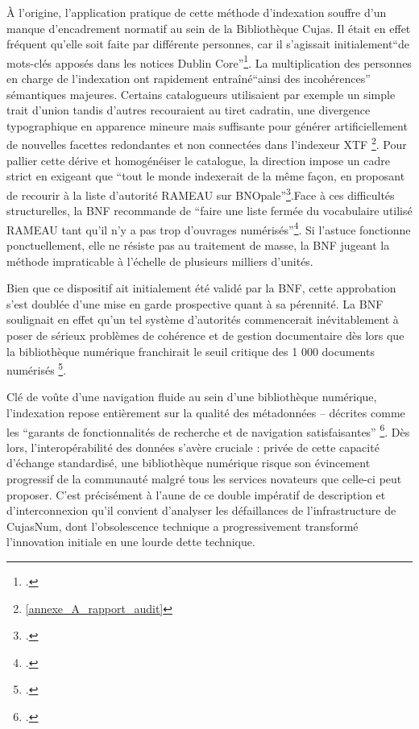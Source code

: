À l'origine, l'application pratique de cette méthode d'indexation souffre d'un manque d'encadrement normatif au sein de la Bibliothèque Cujas. Il était en effet fréquent qu'elle soit faite par différente personnes, car il s'agissait initialement\enquote{de mots-clés apposés dans les notices Dublin Core}\footcite{2013_Num_Indexation_manuel_FHdocEspaceTravail}. La multiplication des personnes en charge de l'indexation ont rapidement entraîné\enquote{ainsi des incohérences} sémantiques majeures. Certains catalogueurs utilisaient par exemple un simple trait d'union tandis d'autres recouraient au tiret cadratin, une divergence typographique en apparence mineure mais suffisante pour générer artificiellement de nouvelles facettes redondantes et non connectées dans l'indexeur \ac{XTF} \footnote{\ref{annexe_A_rapport_audit}}. Pour pallier cette dérive et homogénéiser le catalogue, la direction impose un cadre strict en exigeant que \enquote{tout le monde indexerait de la même façon, en proposant de recourir à la liste d'autorité \ac{RAMEAU} sur BNOpale}\footcite{2013_Num_Indexation_manuel_FHdocEspaceTravail}.Face à ces difficultés structurelles, la \ac{BNF} recommande de \enquote{faire une liste fermée du vocabulaire utilisé \ac{RAMEAU} tant qu'il n'y a pas trop d'ouvrages numérisés}\footcite{2013_Num_Indexation_manuel_FHdocEspaceTravail}. Si l'astuce fonctionne ponctuellement, elle ne résiste pas au traitement de masse, la \ac{BNF} jugeant la méthode impraticable à l'échelle de plusieurs milliers d'unités. 

Bien que ce dispositif ait initialement été  validé par la \ac{BNF}, cette approbation s'est doublée d'une mise en garde prospective quant à sa pérennité. La \ac{BNF} soulignait en effet qu'un tel système d'autorités commencerait inévitablement à poser de sérieux problèmes de cohérence et de gestion documentaire dès lors que la bibliothèque numérique franchirait le seuil critique des 1 000 documents numérisés \footcite{2013_Num_Indexation_manuel_FHdocEspaceTravail}.

Clé de voûte d'une navigation fluide au sein d'une bibliothèque numérique, l'indexation repose entièrement sur la qualité des métadonnées -- décrites comme les \enquote{garants de fonctionnalités de recherche et de navigation satisfaisantes} \footcite{stutzmannSignalerRessourcesNumerisees2013}. Dès lors, l'interopérabilité des données s'avère cruciale : privée de cette capacité d'échange standardisé, une bibliothèque numérique risque son évincement progressif de la communauté malgré tous les services novateurs que celle-ci peut proposer. C'est précisément à l'aune de ce double impératif de description et d'interconnexion qu'il convient d'analyser les défaillances de l'infrastructure de CujasNum, dont l'obsolescence technique a progressivement transformé l'innovation initiale en une lourde dette technique.
